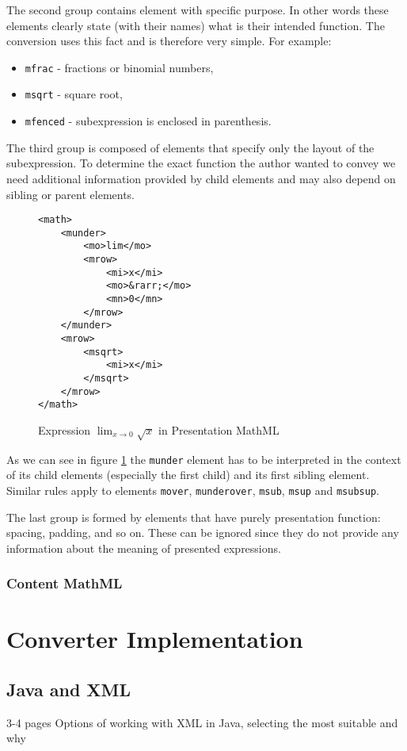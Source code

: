 \documentclass[11pt,oneside,final]{fithesis2}
\begin{document}
The second group contains element with specific purpose. In other words these elements clearly state (with their names) what is their intended function. The conversion uses this fact and is therefore very simple. For example:
\begin{itemize}
\item \texttt{mfrac} - fractions or binomial numbers,
\item \texttt{msqrt} - square root,
\item \texttt{mfenced} - subexpression is enclosed in parenthesis.
\end{itemize}

The third group is composed of elements that specify only the layout of the subexpression. To determine the exact function the author wanted to convey we need additional information provided by child elements and may also depend on sibling or parent elements. 
\begin{figure}[!ht]
\lstset{language=XML,frame=lines}
\begin{lstlisting}
<math>
	<munder>
		<mo>lim</mo>
		<mrow>
			<mi>x</mi>
			<mo>&rarr;</mo>
			<mn>0</mn>
		</mrow>		
	</munder>
	<mrow>
		<msqrt>
			<mi>x</mi>
		</msqrt>
	</mrow>
</math>
\end{lstlisting}
\caption{Expression $\lim_{x \to 0}\sqrt{x}$ in Presentation MathML}
\label{fig:mathmllimit}
\end{figure}
As we can see in figure \ref{fig:mathmllimit} the \texttt{munder} element has to be interpreted in the context of its child elements (especially the first child) and its first sibling element. Similar rules apply to elements \texttt{mover}, \texttt{munderover}, \texttt{msub}, \texttt{msup} and \texttt{msubsup}.

The last group is formed by elements that have purely presentation function: spacing, padding, and so on. These can be ignored since they do not provide any information about the meaning of presented expressions.

\subsection{Content MathML}

\chapter{Converter Implementation}
\section{Java and XML}
3-4 pages Options of working with XML in Java, selecting the most suitable and why
\end{document}
